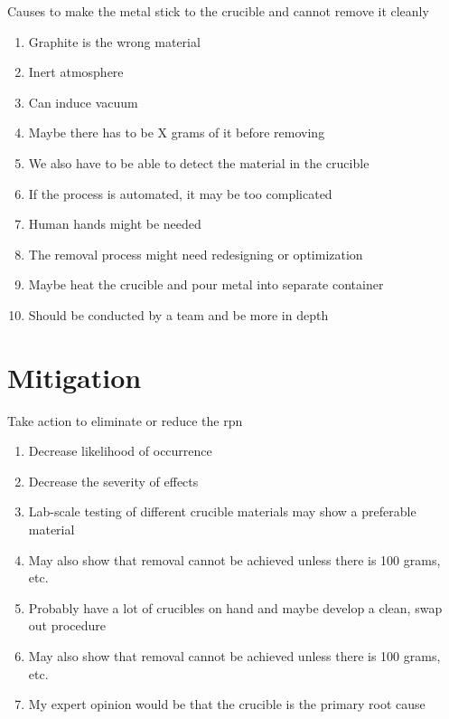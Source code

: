 \documentclass[aspectratio=1610,pdftex,dvipsnames,compress,xcolor={dvipsnames}]{beamer}
\newcommand{\acs}{\acrshort} %
\begin{document}
\begin{frame}{Causes to make the metal stick to the crucible and cannot remove it cleanly}
    \begin{enumerate}[series=outerlist,topsep=0pt,itemsep=5pt,leftmargin=*,label=(\arabic*)]
        \item[]Graphite is the wrong material  
        \item[]Inert atmosphere
        \item[]Can induce vacuum
        \item[]Maybe there has to be X grams of it before removing  
        \item[]We also have to be able to detect the material in the crucible
        \item[]If the process is automated, it may be too complicated   
        \item[]Human hands might be needed  
        \item[]The removal process might need redesigning or optimization
        \item[]Maybe heat the crucible and pour metal into separate container
        \item[]Should be conducted by a team and be more in depth
    \end{enumerate}
\end{frame}


\section{Mitigation}


\addtocounter{framenumber}{-1}
\begin{frame}{Take action to eliminate or reduce the \acs{rpn}}
    \begin{enumerate}[series=outerlist,topsep=0pt,itemsep=7pt,leftmargin=*,label=(\arabic*)]
        \item[]Decrease likelihood of occurrence
        \item[]Decrease the severity of effects
        \item[]Lab-scale testing of different crucible materials may show a preferable material  
        \item[]May also show that removal cannot be achieved unless there is 100 grams, etc.
        \item[]Probably have a lot of crucibles on hand and maybe develop a clean, swap out procedure  
        \item[]May also show that removal cannot be achieved unless there is 100 grams, etc.
        \item[]My expert opinion would be that the crucible is the primary root cause
    \end{enumerate}
\end{frame}
\end{document}
